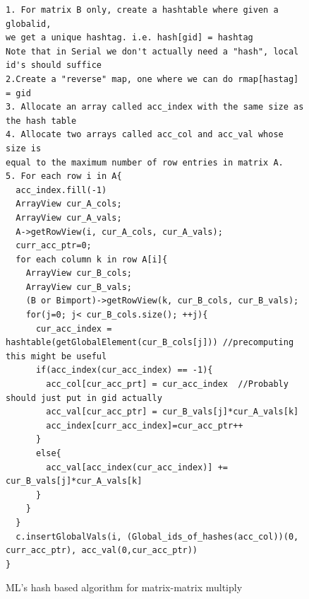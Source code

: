 \documentclass{article}
\begin{document}
\begin{figure}
\centering
{\footnotesize
\begin{verbatim}
1. For matrix B only, create a hashtable where given a globalid, 
we get a unique hashtag. i.e. hash[gid] = hashtag
Note that in Serial we don't actually need a "hash", local id's should suffice
2.Create a "reverse" map, one where we can do rmap[hastag] = gid
3. Allocate an array called acc_index with the same size as the hash table
4. Allocate two arrays called acc_col and acc_val whose size is 
equal to the maximum number of row entries in matrix A.
5. For each row i in A{
  acc_index.fill(-1)
  ArrayView cur_A_cols;
  ArrayView cur_A_vals;
  A->getRowView(i, cur_A_cols, cur_A_vals);
  curr_acc_ptr=0;
  for each column k in row A[i]{
    ArrayView cur_B_cols;
    ArrayView cur_B_vals;
    (B or Bimport)->getRowView(k, cur_B_cols, cur_B_vals);
    for(j=0; j< cur_B_cols.size(); ++j){
      cur_acc_index = hashtable(getGlobalElement(cur_B_cols[j])) //precomputing this might be useful
      if(acc_index(cur_acc_index) == -1){
        acc_col[cur_acc_prt] = cur_acc_index  //Probably should just put in gid actually
        acc_val[cur_acc_ptr] = cur_B_vals[j]*cur_A_vals[k]
        acc_index[curr_acc_index]=cur_acc_ptr++
      }
      else{
        acc_val[acc_index(cur_acc_index)] += cur_B_vals[j]*cur_A_vals[k]
      }
    }
  }
  c.insertGlobalVals(i, (Global_ids_of_hashes(acc_col))(0, curr_acc_ptr), acc_val(0,cur_acc_ptr))
}

\end{verbatim}
}
\caption[Hash based algorithm]{ML's hash based algorithm for matrix-matrix multiply}
\label{hashalgo}
\end{figure}
\end{document}
